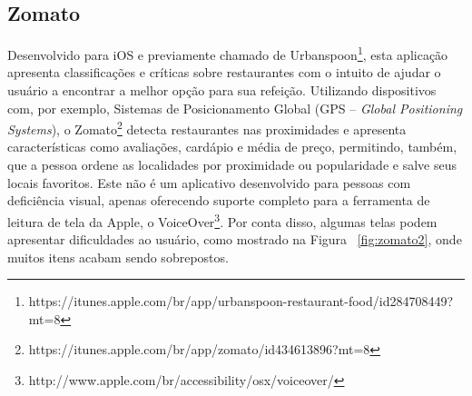 \subsection{Zomato}
Desenvolvido para iOS e previamente chamado de Urbanspoon\footnote{https://itunes.apple.com/br/app/urbanspoon-restaurant-food/id284708449?mt=8},  esta aplicação apresenta classificações e críticas sobre restaurantes com o intuito de ajudar o usuário a encontrar a melhor opção para sua refeição. Utilizando dispositivos com, por exemplo, Sistemas de Posicionamento Global (GPS -- \emph{Global Positioning Systems}), o Zomato\footnote{https://itunes.apple.com/br/app/zomato/id434613896?mt=8} detecta restaurantes nas proximidades e apresenta características como avaliações, cardápio e média de preço, permitindo, também, que a pessoa ordene as localidades por proximidade ou popularidade e salve seus locais favoritos. Este não é um aplicativo desenvolvido para pessoas com deficiência visual, apenas oferecendo suporte completo para a ferramenta de leitura de tela da Apple, o VoiceOver\footnote{http://www.apple.com/br/accessibility/osx/voiceover/}. Por conta disso, algumas telas podem apresentar dificuldades ao usuário, como mostrado na Figura ~\ref{fig:zomato2}, onde muitos itens acabam sendo sobrepostos.

